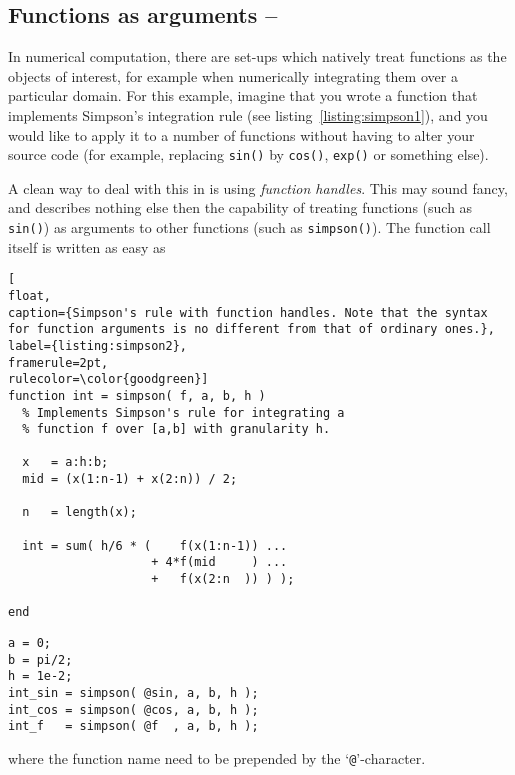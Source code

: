 \subsection{Functions as arguments -- \cleansymbol\cleansymbol\cleansymbol}

In numerical computation, there are set-ups which natively treat functions as
the objects of interest, for example when numerically integrating them over a
particular domain. For this example, imagine that you wrote a function that
implements Simpson's integration rule (see listing~\ref{listing:simpson1}),
and you would like to apply it to a number of functions without having to
alter your source code (for example, replacing \lstinline!sin()! by
\lstinline!cos()!, \lstinline!exp()! or something else).

A clean way to deal with this in \matlab{} is using \emph{function handles}. This may sound fancy, and describes nothing else then the capability of treating functions (such as \lstinline!sin()!) as arguments to other functions (such as \lstinline!simpson()!). The function call itself is written as easy as

\begin{lstlisting}[
float,
caption={Simpson's rule with function handles. Note that the syntax for function arguments is no different from that of ordinary ones.},
label={listing:simpson2},
framerule=2pt,
rulecolor=\color{goodgreen}]
function int = simpson( f, a, b, h )
  % Implements Simpson's rule for integrating a
  % function f over [a,b] with granularity h.

  x   = a:h:b;
  mid = (x(1:n-1) + x(2:n)) / 2;

  n   = length(x);

  int = sum( h/6 * (    f(x(1:n-1)) ...
                    + 4*f(mid     ) ...
                    +   f(x(2:n  )) ) );

end
\end{lstlisting}

\hfill
\begin{minipage}[t]{.90\textwidth}
\begin{lstlisting}[framerule=1pt,rulecolor=\color{goodgreen}]
a = 0;
b = pi/2;
h = 1e-2;
int_sin = simpson( @sin, a, b, h );
int_cos = simpson( @cos, a, b, h );
int_f   = simpson( @f  , a, b, h );
\end{lstlisting}
\end{minipage}
\hfill

where the function name need to be prepended by the `\lstinline!@!'-character.

